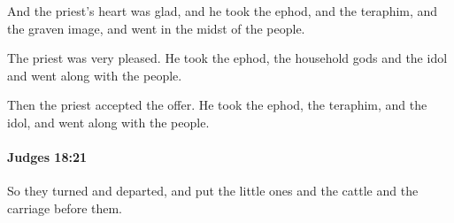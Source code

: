 			\begin{versebox}
					\item[BHS] 
					\item[ASV] And the priest's heart was glad, and he took the ephod, and the teraphim, and the graven image, and went in the midst of the people.
					\item[NIV] The priest was very pleased. He took the ephod, the household gods and the idol and went along with the people.
					\item[NRSV] Then the priest accepted the offer. He took the ephod, the teraphim, and the idol, and went along with the people.
			\end{versebox}

		\paragraph{Judges 18:21} %
			\label{JUDGES-18-21}

			So they turned and departed, and put the little ones and the cattle and the carriage before them.

